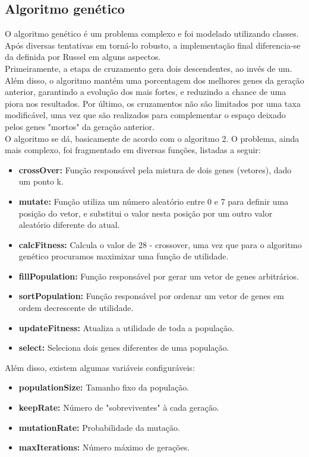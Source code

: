 \documentclass[conference]{IEEEtran}
\begin{document}
	\subsection{Algoritmo genético}
	O algoritmo genético é um problema complexo e foi modelado utilizando classes. Após diversas tentativas em torná-lo
	robusto, a implementação final diferencia-se da definida por Russel\cite{norvig2014inteligencia} em alguns aspectos.\\
	Primeiramente, a etapa de cruzamento gera dois descendentes, ao invés de um. Além disso, o algoritmo mantém uma porcentagem dos melhores genes da geração anterior, garantindo a evolução dos mais fortes, e reduzindo a chance de uma piora nos resultados. Por último, os cruzamentos não são limitados por uma taxa modificável, uma vez que são realizados para complementar o espaço deixado pelos genes "mortos" da geração anterior.\\
	O algoritmo se dá, basicamente de acordo com o algoritmo 2. O problema, ainda mais complexo, foi fragmentado em diversas funções, listadas a seguir:
	\begin{itemize}
		\item \textbf{crossOver:} Função responsável pela mistura de dois genes (vetores), dado um ponto k.
		\item \textbf{mutate:} Função utiliza um número aleatório entre 0 e 7 para definir uma posição do vetor, e substitui o valor nesta posição por um outro valor aleatório diferente do atual.
		\item \textbf{calcFitness:} Calcula o valor de 28 - crossover, uma vez que para o algoritmo genético procuramos maximixar uma função de utilidade.
		\item \textbf{fillPopulation:} Função responsável por gerar um vetor de genes arbitrários.
		\item \textbf{sortPopulation:} Função responsável por ordenar um vetor de genes em ordem decrescente de utilidade.
		\item \textbf{updateFitness:} Atualiza a utilidade de toda a população.	
		\item \textbf{select:} Seleciona dois genes diferentes de uma população.
	\end{itemize}
	
	Além disso, existem algumas variáveis configuráveis:
	
	\begin{itemize}
		\item \textbf{populationSize:} Tamanho fixo da população.
		\item \textbf{keepRate:} Número de "sobreviventes" à cada geração.
		\item \textbf{mutationRate:} Probabilidade da mutação.
		\item \textbf{maxIterations:} Número máximo de gerações.
	\end{itemize}
	
\end{document}
